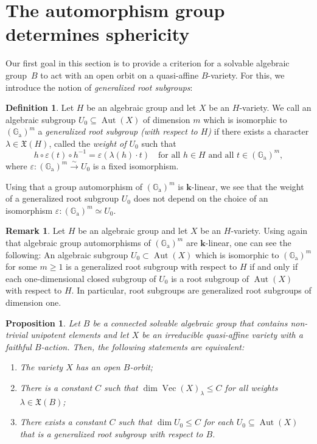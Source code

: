 \documentclass[JEP,XML,SOM,Unicode]{cedram}
\newcommand{\ra}{\mathrm{a}}
\theoremstyle{plain}
\newtheorem{proposition}[theorem]{Proposition}
\theoremstyle{definition}
\newtheorem{remark}[theorem]{Remark}
\newtheorem{definition}[theorem]{Definition}
\DeclareMathOperator{\Aut}{Aut}
\DeclareMathOperator{\Ve}{Vec}
\newcommand{\GG}{\mathbb{G}}
\newcommand{\kk}{{\boldsymbol{k}}}
\begin{document}
\section{The automorphism group determines sphericity}
\label{sec.determination_of_sphericity}

Our first goal in this section is to provide a criterion for a solvable algebraic group~$B$
to act with an open orbit on a quasi-affine $B$-variety.
For this, we introduce the notion of \emph{generalized root
subgroups}:

\begin{definition}
\label{def.generalized_root_subgroup}
Let $H$ be an algebraic group and let $X$ be an $H$-variety.
We call an algebraic subgroup $U_0 \subseteq \Aut(X)$ of dimension $m$
which is isomorphic to $(\GG_\ra)^m$ a
\emph{generalized root subgroup (with respect to $H$)}
if there exists a character $\lambda \in \mathfrak{X}(H)$, called the \emph{weight of $U_0$} such that
\[
h \circ \varepsilon(t) \circ h^{-1} = \varepsilon(\lambda(h) \cdot t) \quad
\textrm{for all $h \in H$ and all $t \in (\GG_\ra)^m$},
\]
where $\varepsilon \colon (\GG_\ra)^m \stackrel{\sim}{\to} U_0$ is a fixed isomorphism.
\end{definition}

Using that a group automorphism of $(\GG_\ra)^m$ is $\kk$-linear, we
see that the weight of a generalized root subgroup $U_0$ does not depend on the choice
of an isomorphism $\varepsilon \colon (\GG_\ra)^m \simeq U_0$.

\begin{remark}
\label{rem.equivalent_def_gen_root_subgroup}
Let $H$ be an algebraic group and let $X$ be an $H$-variety.
Using again that algebraic
group automorphisms of $(\GG_\ra)^m$ are $\kk$-linear, one can see the following:
An algebraic subgroup $U_0 \subset \Aut(X)$
which is isomorphic to $(\GG_\ra)^m$ for some $m \geq 1$
is a generalized root subgroup with respect to $H$
if and only if each one-dimensional closed subgroup of $U_0$ is a root subgroup of $\Aut(X)$
with respect to $H$.
In particular, root subgroups are generalized root subgroups of dimension one.
\end{remark}

\begin{proposition}
\label{prop:characterization_of_aff_spherical_var}
Let $B$ be a connected solvable algebraic group that contains non-trivial unipotent elements and
let $X$ be an irreducible quasi-affine variety with a faithful $B$-action.
Then, the following statements are equivalent:
\begin{enumerate}
\item \label{item:Open_B-orbit} The variety $X$ has an open $B$-orbit;
\item \label{item:Boundedness_of_homogeneous_LNDs}
There is a constant $C$ such that $\dim \Ve(X)_{\lambda} \leq C$
for all weights $\lambda \in \mathfrak{X}(B)$;
\item \label{item:Commutative_unipot_subgroups}
There exists a constant $C$ such that
$\dim U_0 \leq C$ for each $U_0 \subseteq \Aut(X)$ that is a
generalized root subgroup with respect to $B$.
\end{enumerate}
\end{proposition}
\end{document}
